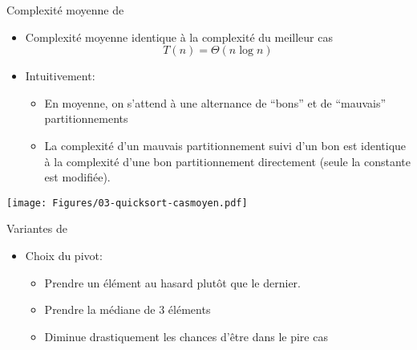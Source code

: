 \begin{frame}{Complexité moyenne de }
\begin{itemize}
\item Complexité moyenne identique à la complexité du meilleur cas
$$T(n)=\Theta(n\log n)$$
\item Intuitivement:
\begin{itemize}
\item En moyenne, on s'attend à une alternance de ``bons'' et de
  ``mauvais'' partitionnements
\item La complexité d'un mauvais partitionnement suivi d'un bon est
  identique à la complexité d'une bon partitionnement directement
  (seule la constante est modifiée).
\end{itemize}
\end{itemize}
\centerline{\texttt{[image: Figures/03-quicksort-casmoyen.pdf]}}


\end{frame}

\begin{frame}{Variantes de }

\begin{itemize}
\item Choix du pivot:
\begin{itemize}
\item Prendre un élément au hasard plutôt que le dernier.
\item Prendre la médiane de 3 éléments
\item Diminue drastiquement les chances d'être dans le pire cas
\end{itemize}
\end{itemize}

\begin{small}
\begin{center}

\bigskip

\end{center}
\end{small}

\end{frame}

